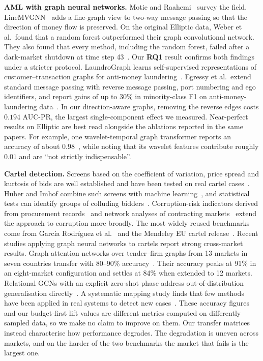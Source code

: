 \documentclass[conference]{IEEEtran}
\newcommand{\RQ}[1]{\textbf{RQ#1}}
\begin{document}
\textbf{AML with graph neural networks.} Motie and Raahemi~\cite{motie2024}
survey the field. LineMVGNN~\cite{linemv2025} adds a line-graph view to two-way
message passing so that the direction of money flow is preserved. On the
original Elliptic data, Weber et al.\ found that a random forest outperformed their graph
convolutional network. They also found that every method, including the random
forest, failed after a dark-market shutdown at time step 43~\cite{weber2019}.
Our \RQ{1} result confirms both findings under a stricter protocol. LaundroGraph
learns self-supervised representations of customer--transaction graphs for
anti-money laundering~\cite{cardoso2022}. Egressy et al.\ extend standard
message passing with reverse message passing, port numbering and ego
identifiers, and report gains of up to 30\% in minority-class F1 on
anti-money-laundering data~\cite{egressy2024}. In our direction-aware graphs,
removing the reverse edges costs $0.194$ AUC-PR, the largest single-component
effect we measured. Near-perfect results on Elliptic are best read alongside the
ablations reported in the same papers. For example, one wavelet-temporal graph
transformer reports an accuracy of about $0.98$~\cite{lin2026}, while noting
that its wavelet features contribute roughly $0.01$ and are ``not strictly
indispensable''.

\textbf{Cartel detection.} Screens based on the coefficient of variation,
price spread and kurtosis of bids are well established and have been tested on
real cartel cases~\cite{imhof2018}. Huber and Imhof combine such screens with
machine learning~\cite{huber2019}, and statistical tests can identify groups of
colluding bidders~\cite{conley2016}. Corruption-risk indicators derived from
procurement records~\cite{fazekas2020} and network analyses of contracting
markets~\cite{wachs2021} extend the approach to corruption more broadly. The
most widely reused benchmarks come from Garc\'ia Rodr\'iguez et
al.~\cite{garcia2022} and the Mendeley EU cartel release~\cite{mendeley2025}.
Recent studies applying graph neural networks to cartels report strong
cross-market results. Graph attention networks over tender--firm graphs from 13 markets in seven
countries transfer with 80--90\% accuracy~\cite{imhof2025}. Their accuracy
peaks at 91\% in an eight-market configuration and settles at 84\% when
extended to 12 markets. Relational GCNs with an explicit zero-shot phase
address out-of-distribution generalisation directly~\cite{gomes2024}. A
systematic mapping study finds that few methods have been applied in real
systems to detect new cases~\cite{epjds2025}. These accuracy figures and our
budget-first lift values are different metrics computed on differently sampled
data, so we make no claim to improve on them. Our transfer matrices instead
characterise how performance degrades. The degradation is uneven across
markets, and on the harder of the two benchmarks the market that fails is the
largest one.
\end{document}
